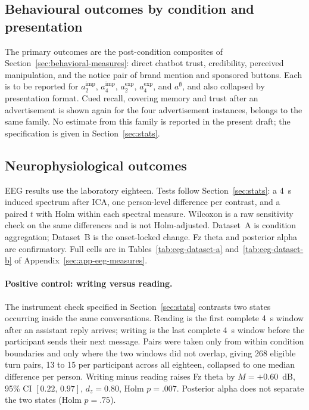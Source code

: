 \documentclass[english]{article}
\begin{document}
\subsection{Behavioural outcomes by condition and presentation}
\label{sec:results-behaviour}

The primary outcomes are the post-condition composites of Section~\ref{sec:behavioral-measures}: direct chatbot trust, credibility, perceived manipulation, and the notice pair of brand mention and sponsored buttons. Each is to be reported for \(a^{\mathrm{imp}}_2\), \(a^{\mathrm{imp}}_4\), \(a^{\mathrm{exp}}_2\), \(a^{\mathrm{exp}}_4\), and \(a^{\emptyset}\), and also collapsed by presentation format. Cued recall, covering memory and trust after an advertisement is shown again for the four advertisement instances, belongs to the same family. No estimate from this family is reported in the present draft; the specification is given in Section~\ref{sec:stats}.

\subsection{Neurophysiological outcomes}
\label{sec:results-eeg}

EEG results use the laboratory eighteen. Tests follow Section~\ref{sec:stats}: a 4~s induced spectrum after ICA, one person-level difference per contrast, and a paired \(t\) with Holm within each spectral measure. Wilcoxon is a raw sensitivity check on the same differences and is not Holm-adjusted. Dataset~A is condition aggregation; Dataset~B is the onset-locked change. Fz theta and posterior alpha are confirmatory. Full cells are in Tables~\ref{tab:eeg-dataset-a} and~\ref{tab:eeg-dataset-b} of Appendix~\ref{sec:app-eeg-measures}.

\paragraph{Positive control: writing versus reading.}
The instrument check specified in Section~\ref{sec:stats} contrasts two states occurring inside the same conversations. Reading is the first complete 4~s window after an assistant reply arrives; writing is the last complete 4~s window before the participant sends their next message. Pairs were taken only from within condition boundaries and only where the two windows did not overlap, giving 268 eligible turn pairs, 13 to 15 per participant across all eighteen, collapsed to one median difference per person. Writing minus reading raises Fz theta by \(M=+0.60\)~dB, 95\% CI \([0.22,\,0.97]\), \(d_z=0.80\), Holm \(p=.007\). Posterior alpha does not separate the two states (Holm \(p=.75\)).
\end{document}
